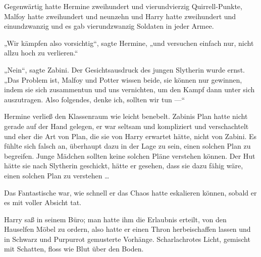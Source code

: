 Gegenwärtig hatte Hermine zweihundert und vierundvierzig Quirrell-Punkte, Malfoy hatte zweihundert und neunzehn und Harry hatte zweihundert und einundzwanzig und es gab vierundzwanzig Soldaten in jeder Armee.

„Wir kämpfen also vorsichtig“, sagte Hermine, „und versuchen einfach nur, nicht allzu hoch zu verlieren.“

„Nein“, sagte Zabini. Der Gesichtsausdruck des jungen Slytherin wurde ernst.
„Das Problem ist, Malfoy und Potter wissen beide, sie können nur gewinnen, indem sie sich zusammentun und uns vernichten, um den Kampf dann unter sich auszutragen. Also folgendes, denke ich, sollten wir tun —“

Hermine verließ den Klassenraum wie leicht benebelt. Zabinis Plan hatte nicht gerade auf der Hand gelegen, er war seltsam und kompliziert und verschachtelt und eher die Art von Plan, die sie von Harry erwartet hätte, nicht von Zabini. Es fühlte sich falsch an, überhaupt dazu in der Lage zu sein, einen solchen Plan zu begreifen. Junge Mädchen sollten keine solchen Pläne verstehen können. Der Hut hätte sie nach Slytherin geschickt, hätte er gesehen, dass sie dazu fähig wäre, einen solchen Plan zu verstehen …

\later

Das Fantastische war, wie schnell er das Chaos hatte eskalieren können, sobald er es mit voller Absicht tat.

Harry saß in seinem Büro; man hatte ihm die Erlaubnis erteilt, von den Hauselfen Möbel zu ordern, also hatte er einen Thron herbeischaffen lassen und in Schwarz und Purpurrot gemusterte Vorhänge. Scharlachrotes Licht, gemischt mit Schatten, floss wie Blut über den Boden.

